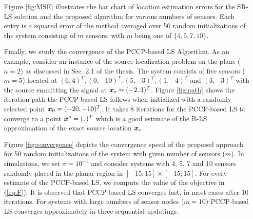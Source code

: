 Figure \ref{fig:MSE} illustrates the bar chart of location estimation errors for the SR-LS solution and the proposed algorithm for various numbers of sensors. Each entry is a squared error of the method averaged over 50 random initializations of the system  consisting of $m$ sensors, with $m$ being one of $\{4, 5, 7, 10\}$.
 
Finally, we study the convergence of the  PCCP-based LS Algorithm. As an example, consider an instance of the source localization problem on the plane ($n = 2$) as discussed in Sec. 2.1 of the thesis. The system consists of five sensors ($m = 5$) located at $(6,4)^T, (0,-10)^T, (5,-3)^T, (1,-4)^T$ and  $(3,-3)^T$ with the source emmitting the signal at $\mbox{\boldmath$x$}_s = (-2,3)^T$. Figure \ref{fig:path} shows the iteration path the PCCP-based LS follows when initialized with a randomly selected point $\mbox{\boldmath$x$}_0 = (-20,-10)^T$. It takes 8 iterations for the PCCP-based LS to converge to a point $\mbox{\boldmath$x$}^* = (,)^T$ which is a good estimate of the R-LS approximation of the exact source location $\mbox{\boldmath$x$}_s$.


Figure  \ref{fig:convergence} depicts the convergence speed of the proposed approach for 50 random initializations of the system with given number of sensors ($m$). In simulations, we set $\sigma = 10^{-1}$ and consider systems with 4, 5, 7 and 10 sensors randomly placed in the planar region in $[-15;15]\times[-15;15]$. For every estimate of the PCCP-based LS, we compute the value of the objective in (\ref{eq:F}). It is observed that PCCP-based LS converges fast, in most cases after $10$ iterations. For systems with large numbers of sensor nodes ($m = 10$) PCCP-based LS converges approximately
in three sequential updatings.


